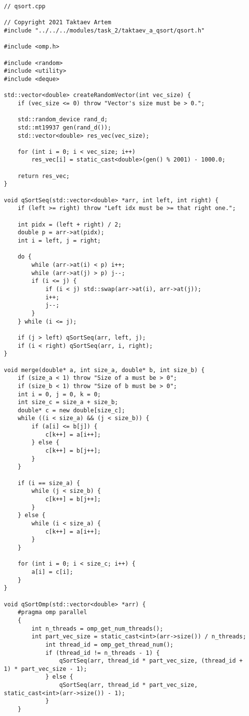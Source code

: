 \documentclass{report}
\begin{document}
\begin{lstlisting}
// qsort.cpp

// Copyright 2021 Taktaev Artem
#include "../../../modules/task_2/taktaev_a_qsort/qsort.h"

#include <omp.h>

#include <random>
#include <utility>
#include <deque>

std::vector<double> createRandomVector(int vec_size) {
    if (vec_size <= 0) throw "Vector's size must be > 0.";

    std::random_device rand_d;
    std::mt19937 gen(rand_d());
    std::vector<double> res_vec(vec_size);

    for (int i = 0; i < vec_size; i++)
        res_vec[i] = static_cast<double>(gen() % 2001) - 1000.0;

    return res_vec;
}

void qSortSeq(std::vector<double> *arr, int left, int right) {
    if (left >= right) throw "Left idx must be >= that right one.";

    int pidx = (left + right) / 2;
    double p = arr->at(pidx);
    int i = left, j = right;

    do {
        while (arr->at(i) < p) i++;
        while (arr->at(j) > p) j--;
        if (i <= j) {
            if (i < j) std::swap(arr->at(i), arr->at(j));
            i++;
            j--;
        }
    } while (i <= j);

    if (j > left) qSortSeq(arr, left, j);
    if (i < right) qSortSeq(arr, i, right);
}

void merge(double* a, int size_a, double* b, int size_b) {
    if (size_a < 1) throw "Size of a must be > 0";
    if (size_b < 1) throw "Size of b must be > 0";
    int i = 0, j = 0, k = 0;
    int size_c = size_a + size_b;
    double* c = new double[size_c];
    while ((i < size_a) && (j < size_b)) {
        if (a[i] <= b[j]) {
            c[k++] = a[i++];
        } else {
            c[k++] = b[j++];
        }
    }

    if (i == size_a) {
        while (j < size_b) {
            c[k++] = b[j++];
        }
    } else {
        while (i < size_a) {
            c[k++] = a[i++];
        }
    }

    for (int i = 0; i < size_c; i++) {
        a[i] = c[i];
    }
}

void qSortOmp(std::vector<double> *arr) {
    #pragma omp parallel
    {
        int n_threads = omp_get_num_threads();
        int part_vec_size = static_cast<int>(arr->size()) / n_threads;
            int thread_id = omp_get_thread_num();
            if (thread_id != n_threads - 1) {
                qSortSeq(arr, thread_id * part_vec_size, (thread_id + 1) * part_vec_size - 1);
            } else {
                qSortSeq(arr, thread_id * part_vec_size, static_cast<int>(arr->size()) - 1);
            }
    }


\end{lstlisting}
\end{document}
